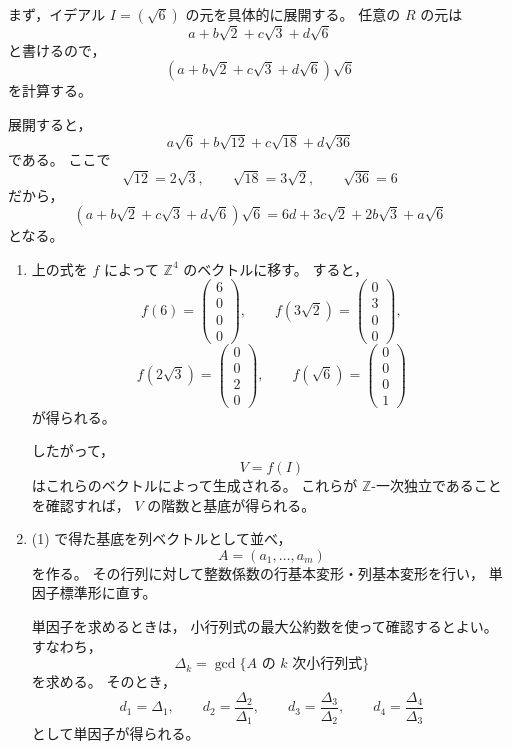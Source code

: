 \begin{strategy}
	まず，イデアル \(I=(\sqrt{6})\) の元を具体的に展開する。
	任意の \(R\) の元は
	\[
	a+b\sqrt{2}+c\sqrt{3}+d\sqrt{6}
	\]
	と書けるので，
	\[
	(a+b\sqrt{2}+c\sqrt{3}+d\sqrt{6})\sqrt{6}
	\]
	を計算する。
	
	展開すると，
	\[
	a\sqrt{6}
	+
	b\sqrt{12}
	+
	c\sqrt{18}
	+
	d\sqrt{36}
	\]
	である。
	ここで
	\[
	\sqrt{12}=2\sqrt{3},
	\qquad
	\sqrt{18}=3\sqrt{2},
	\qquad
	\sqrt{36}=6
	\]
	だから，
	\[
	(a+b\sqrt{2}+c\sqrt{3}+d\sqrt{6})\sqrt{6}
	=
	6d+3c\sqrt{2}+2b\sqrt{3}+a\sqrt{6}
	\]
	となる。
	
	\begin{enumerate}
		\item[(1)]
		上の式を \(f\) によって \(\mathbb{Z}^4\) のベクトルに移す。
		すると，
		\[
		f(6)=
		\begin{pmatrix}
			6\\
			0\\
			0\\
			0
		\end{pmatrix},
		\qquad
		f(3\sqrt{2})=
		\begin{pmatrix}
			0\\
			3\\
			0\\
			0
		\end{pmatrix},
		\]
		\[
		f(2\sqrt{3})=
		\begin{pmatrix}
			0\\
			0\\
			2\\
			0
		\end{pmatrix},
		\qquad
		f(\sqrt{6})=
		\begin{pmatrix}
			0\\
			0\\
			0\\
			1
		\end{pmatrix}
		\]
		が得られる。
		
		したがって，
		\[
		V=f(I)
		\]
		はこれらのベクトルによって生成される。
		これらが \(\mathbb{Z}\)-一次独立であることを確認すれば，
		\(V\) の階数と基底が得られる。
		
		\item[(2)]
		(1) で得た基底を列ベクトルとして並べ，
		\[
		A=(a_1,\ldots,a_m)
		\]
		を作る。
		その行列に対して整数係数の行基本変形・列基本変形を行い，
		単因子標準形に直す。
		
		単因子を求めるときは，
		小行列式の最大公約数を使って確認するとよい。
		すなわち，
		\[
		\Delta_k=
		\gcd\{\text{\(A\) の \(k\) 次小行列式}\}
		\]
		を求める。
		そのとき，
		\[
		d_1=\Delta_1,
		\qquad
		d_2=\frac{\Delta_2}{\Delta_1},
		\qquad
		d_3=\frac{\Delta_3}{\Delta_2},
		\qquad
		d_4=\frac{\Delta_4}{\Delta_3}
		\]
		として単因子が得られる。
		

\end{enumerate}
\end{strategy}

